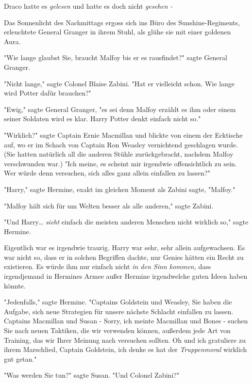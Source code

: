 {Draco hatte es \emph{gelesen} und hatte es doch nicht \emph{gesehen -}

\later

Das Sonnenlicht des Nachmittags ergoss sich ins Büro des Sunshine-Regiments, erleuchtete General Granger in ihrem Stuhl, als glühe sie mit einer goldenen Aura.

"Wie lange glaubst Sie, braucht Malfoy bis er es rausfindet?" sagte General Granger.

"Nicht lange," sagte Colonel Blaise Zabini. "Hat er vielleicht schon. Wie lange wird Potter dafür brauchen?"

"Ewig," sagte General Granger, "es sei denn Malfoy erzählt es ihm oder einem seiner Soldaten wird es klar. Harry Potter denkt einfach nicht so."

"Wirklich?" sagte Captain Ernie Macmillan und blickte von einem der Ecktische auf, wo er im Schach von Captain Ron Weasley vernichtend geschlagen wurde. (Sie hatten natürlich all die anderen Stühle zurückgebracht, nachdem Malfoy verschwunden war.) "Ich meine, es scheint mir irgendwie offensichtlich zu sein. Wer würde denn versuchen, sich alles ganz allein einfallen zu lassen?"

"Harry," sagte Hermine, exakt im gleichen Moment als Zabini sagte, "Malfoy."

"Malfoy hält sich für um Welten besser als alle anderen," sagte Zabini.

"Und Harry… \emph{sieht} einfach die meisten anderen Menschen nicht wirklich so," sagte Hermine.

Eigentlich war es irgendwie traurig. Harry war sehr, sehr allein aufgewachsen. Es war nicht so, dass er in solchen Begriffen dachte, nur Genies hätten ein Recht zu existieren. Es würde ihm nur einfach nicht \emph{in den Sinn kommen,} dass irgendjemand in Hermines Armee außer Hermine irgendwelche guten Ideen haben könnte.

"Jedenfalls," sagte Hermine. "Captains Goldstein und Weasley, Sie haben die Aufgabe, sich neue Strategien für unsere nächste Schlacht einfallen zu lassen. Captains Macmillan und Susan - Sorry, ich meinte Macmillan und Bones - suchen Sie nach neuen Taktiken, die wir verwenden können, außerdem jede Art von Training, das wir Ihrer Meinung nach versuchen sollten. Oh und ich gratuliere zu ihrem Marschlied, Captain Goldstein, ich denke es hat der \emph{Truppenmoral} wirklich gut getan."

"Was werden Sie tun?" sagte Susan. "Und Colonel Zabini?"

}

